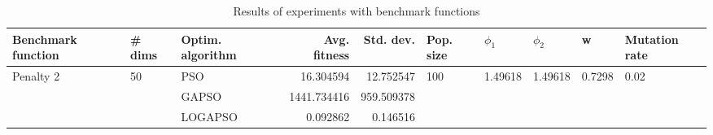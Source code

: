 \begin{table}
\centering
\caption{Results of experiments with benchmark functions}
\begin{tabular}{lllrrlllll}
\toprule
        Benchmark function &             \# dims & Optim. algorithm &  Avg. fitness &  Std. dev. &            Pop. size &               $\phi_{1}$ &               $\phi_{2}$ &                       w &         Mutation rate \\
\midrule
\multirow{3}{*}{Penalty 2} & \multirow{3}{*}{50} &              PSO &     16.304594 &  12.752547 & \multirow{3}{*}{100} & \multirow{3}{*}{1.49618} & \multirow{3}{*}{1.49618} & \multirow{3}{*}{0.7298} & \multirow{3}{*}{0.02} \\
                           &                     &            GAPSO &   1441.734416 & 959.509378 &                      &                          &                          &                         &                       \\
                           &                     &          LOGAPSO &      0.092862 &   0.146516 &                      &                          &                          &                         &                       \\
\bottomrule
\end{tabular}
\end{table}
